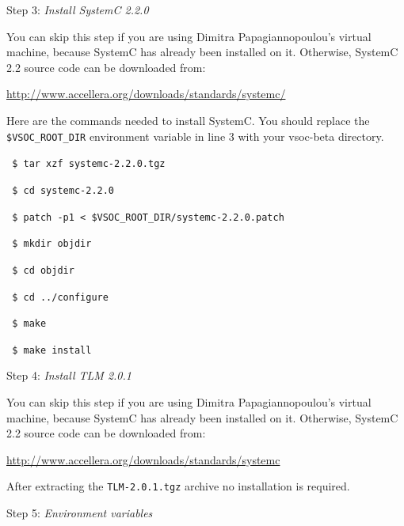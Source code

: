 \documentclass{article}
\begin{document}
\vspace{3mm}
\hangindent=13mm
Step 3: \emph{Install SystemC 2.2.0} 

{
\addtolength{\leftskip}{12.5mm}

You can skip this step if you are using Dimitra Papagiannopoulou's virtual machine, because SystemC has already been installed on it. Otherwise, SystemC 2.2 source code can be downloaded from:

\hspace{5mm}\href{http://www.accellera.org/downloads/standards/systemc/}{http://www.accellera.org/downloads/standards/systemc/}

Here are the commands needed to install SystemC. You should replace the \texttt{\$VSOC\_ROOT\_DIR} environment variable in line 3 with your vsoc-beta directory.

{
\addtolength{\leftskip}{5mm}

\texttt{
\$ tar xzf systemc-2.2.0.tgz
}

\texttt{
\$ cd systemc-2.2.0
}

\texttt{
\$ patch -p1 < \$VSOC\_ROOT\_DIR/systemc-2.2.0.patch
}

\texttt{
\$ mkdir objdir
}

\texttt{
\$ cd objdir
}

\texttt{
\$ cd ../configure
}

\texttt{
\$ make
}

\texttt{
\$ make install
}

}

}


\vspace{3mm}
\hangindent=12.5mm
Step 4: \emph{Install TLM 2.0.1} 

{
\addtolength{\leftskip}{12.5mm}

You can skip this step if you are using Dimitra Papagiannopoulou's virtual machine, because SystemC has already been installed on it. Otherwise, SystemC 2.2 source code can be downloaded from:

\hspace{5mm}\href{http://www.accellera.org/downloads/standards/systemc/}{http://www.accellera.org/downloads/standards/systemc}

After extracting the \texttt{TLM-2.0.1.tgz} archive no installation is required.

}

\vspace{3mm}
\hangindent=12.5mm
Step 5: \emph{Environment variables}
\end{document}
